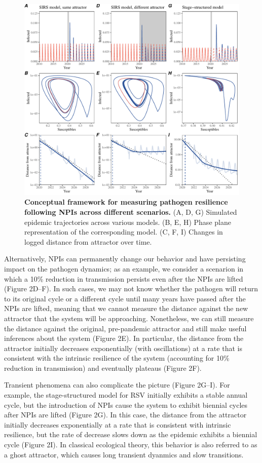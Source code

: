 \documentclass[12pt]{article}
\begin{document}
\begin{figure}[!th]
\includegraphics[width=\textwidth]{../figure2/figure2_simple.pdf}
\caption{
\textbf{Conceptual framework for measuring pathogen resilience following NPIs across different scenarios.}
(A, D, G) Simulated epidemic trajectories across various models. 
(B, E, H) Phase plane representation of the corresponding model.
(C, F, I) Changes in logged distance from attractor over time.
}
\end{figure}

Alternatively, NPIs can permanently change our behavior and have persisting impact on the pathogen dynamics; 
as an example, we consider a scenarion in which a 10\% reduction in transmission persists even after the NPIs are lifted (Figure 2D--F).
In such cases, we may not know whether the pathogen will return to its original cycle or a different cycle until many years have passed after the NPIs are lifted, meaning that we cannot measure the distance against the new attractor that the system will be approaching.
Nonetheless, we can still measure the distance against the original, pre-pandemic attractor and still make useful inferences about the system (Figure 2E).
In particular, the distance from the attractor initially decreases exponentially (with oscillations) at a rate that is consistent with the intrinsic resilience of the system (accounting for 10\% reduction in transmission) and eventually plateaus (Figure 2F). 

Transient phenomena can also complicate the picture (Figure 2G--I).
For example, the stage-structured model for RSV initially exhibits a stable annual cycle, but the introduction of NPIs cause the system to exhibit biennial cycles after NPIs are lifted (Figure 2G).
In this case, the distance from the attractor initially decreases exponentially at a rate that is consistent with intrinsic resilience, but the rate of decrease slows down as the epidemic exhibits a biennial cycle (Figure 2I).
In classical ecological theory, this behavior is also referred to as a ghost attractor, which causes long transient dyanmics and slow transitions.
\end{document}
